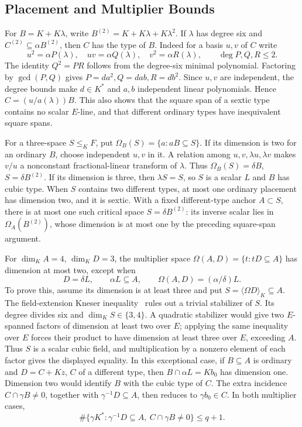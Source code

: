 \documentclass[12pt,letterpaper,onecolumn]{article}
\theoremstyle{definition}
\theoremstyle{remark}
\begin{document}
\subsection{Placement and Multiplier Bounds}
For \(B=K+K\lambda\), write \(B^{(2)}=K+K\lambda+K\lambda^2\).
If \(\lambda\) has degree six and \(C^{(2)}\subseteq\alpha B^{(2)}\), then \(C\) has the type of \(B\).
Indeed for a basis \(u,v\) of \(C\) write
\[
u^2=\alpha P(\lambda),\quad uv=\alpha Q(\lambda),\quad
v^2=\alpha R(\lambda),\qquad \deg P,Q,R\le2.
\]
The identity \(Q^2=PR\) follows from the degree-six minimal polynomial.
Factoring by \(\gcd(P,Q)\) gives \(P=da^2,Q=dab,R=db^2\).
Since \(u,v\) are independent, the degree bounds make \(d\in K^*\) and \(a,b\) independent linear polynomials. Hence \(C=(u/a(\lambda))B\).
This also shows that the square span of a sextic type contains no scalar \(E\)-line, and that different ordinary types have inequivalent square spans.

For a three-space \(S\le_KF\), put \(\Omega_B(S)=\{a:aB\subseteq S\}\).
If its dimension is two for an ordinary \(B\), choose independent \(u,v\) in it. A relation among \(u,v,\lambda u,\lambda v\) makes \(v/u\) a nonconstant fractional-linear transform of \(\lambda\).
Thus \(\Omega_B(S)=\delta B\), \(S=\delta B^{(2)}\).
If its dimension is three, then \(\lambda S=S\), so \(S\) is a scalar \(L\) and \(B\) has cubic type.
When \(S\) contains two different types, at most one ordinary placement has dimension two, and it is sextic.
With a fixed different-type anchor \(A\subset S\), there is at most one such critical space \(S=\delta B^{(2)}\): its inverse scalar lies in \(\Omega_A(B^{(2)})\), whose dimension is at most one by the preceding square-span argument.

For \(\dim_KA=4\), \(\dim_KD=3\), the multiplier space
\(\Omega(A,D)=\{t:tD\subseteq A\}\) has dimension at most two, except when
\[
D=\delta L,\qquad \alpha L\subseteq A,\qquad
\Omega(A,D)=(\alpha/\delta)L.
\]
To prove this, assume its dimension is at least three and put \(S=\langle\Omega D\rangle_K\subseteq A\).
The field-extension Kneser inequality~\cite{kneser} rules out a trivial stabilizer of \(S\).
Its degree divides six and \(\dim_KS\in\{3,4\}\).
A quadratic stabilizer would give two \(E\)-spanned factors of dimension at least two over \(E\); applying the same inequality over \(E\) forces their product to have dimension at least three over \(E\), exceeding \(A\).
Thus \(S\) is a scalar cubic field, and multiplication by a nonzero element of each factor gives the displayed equality.
In this exceptional case, if \(B\subseteq A\) is ordinary and \(D=C+Kz\), \(C\) of a different type, then \(B\cap\alpha L=Kb_0\) has dimension one.
Dimension two would identify \(B\) with the cubic type of \(C\).
The extra incidence \(C\cap\gamma B\ne0\), together with \(\gamma^{-1}D\subseteq A\), then reduces to \(\gamma b_0\in C\).
In both multiplier cases,
\begin{equation}\label{eq:core-multiplier-count}
\#\{\gamma K^*:\gamma^{-1}D\subseteq A,
\ C\cap\gamma B\ne0\}\le q+1.
\end{equation}
\end{document}

